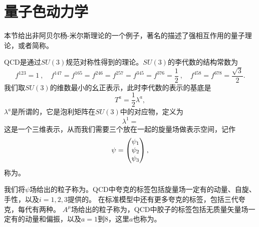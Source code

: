 \chapter{量子色动力学}

本节给出非阿贝尔杨-米尔斯理论的一个例子，著名的描述了强相互作用的量子理论，或者简称。

QCD是通过$SU(3)$规范对称性得到的理论。$SU(3)$的李代数的结构常数为
\begin{equation}
    f^{123}=1\ ,\quad f^{147}=f^{165}=f^{246}=f^{257}=f^{345}=f^{376}={\frac {1}{2}}\ ,\quad f^{458}=f^{678}={\frac {\sqrt {3}}{2}}.
\end{equation}
我们取$SU(3)$的维数最小的幺正表示，此时李代数的表示的基底是
\begin{equation}
    T^a = \frac{1}{2} \lambda^a,
\end{equation}
$\lambda^a$是所谓的，它是泡利矩阵在$SU(3)$中的对应物，定义为
\begin{equation}
    \lambda^1 = 
\end{equation}
这是一个三维表示，从而我们需要三个放在一起的旋量场做表示空间，记作
\begin{equation}
    \psi = \pmqty{\psi_1 \\ \psi_2 \\ \psi_3},
\end{equation}
称为。

我们将$\psi$场给出的粒子称为。QCD中夸克的标签包括旋量场一定有的动量、自旋、手性，以及$i=1, 2, 3$提供的。
在标准模型中还有更多夸克的标签，包括三代夸克，每代有两种。
$A^\mu$场给出的粒子称为，QCD中胶子的标签包括无质量矢量场一定有的动量和偏振，以及$a=1$到$8$，这里$a$也称为。
